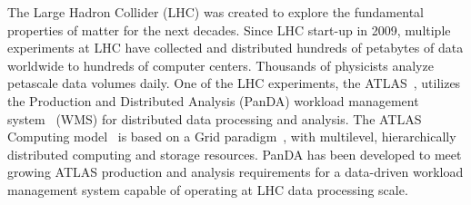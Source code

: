 The Large Hadron Collider (LHC) was created to explore the fundamental
properties of matter for the next decades.  Since LHC start-up in 2009,
multiple experiments  at LHC have collected and distributed hundreds of
petabytes of data worldwide to hundreds of computer centers.
Thousands of physicists analyze petascale data volumes daily.
One of the LHC experiments, the ATLAS~\cite{Aad:2008}, utilizes the Production
and Distributed Analysis (PanDA) workload management system~\cite{Maeno2011}
(WMS) for distributed data processing and analysis. The ATLAS Computing
model~\cite{Atlas2005} is based on a Grid paradigm~\cite{Foster:1998}, with
multilevel, hierarchically distributed computing and storage resources. PanDA
has been developed to meet growing ATLAS production and analysis requirements
for a data-driven workload management system capable of operating at LHC data
processing scale.





